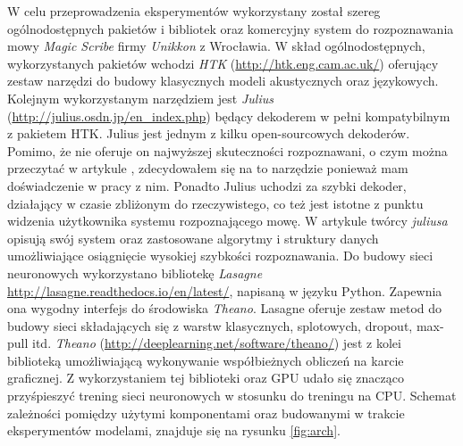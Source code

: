 \documentclass[11pt]{article}
\begin{document}
	W celu przeprowadzenia eksperymentów wykorzystany został szereg ogólnodostępnych pakietów i bibliotek oraz komercyjny system do rozpoznawania mowy \textit{Magic Scribe} firmy \textit{Unikkon} z Wrocławia. W skład ogólnodostępnych, wykorzystanych pakietów wchodzi \textit{HTK} (\url{http://htk.eng.cam.ac.uk/}) oferujący zestaw narzędzi do budowy klasycznych modeli akustycznych oraz językowych. Kolejnym wykorzystanym narzędziem jest \textit{Julius} (\url{http://julius.osdn.jp/en_index.php}) będący dekoderem w pełni kompatybilnym z pakietem HTK. Julius jest jednym z kilku open-sourcowych dekoderów. Pomimo, że nie oferuje on najwyższej skuteczności rozpoznawani, o czym można przeczytać w artykule \cite{asr_toolkit_cmp}, zdecydowałem się na to narzędzie ponieważ mam doświadczenie w pracy z nim. Ponadto Julius uchodzi za szybki dekoder, działający w czasie zbliżonym do rzeczywistego, co też jest istotne z punktu widzenia użytkownika systemu rozpoznającego mowę. W artykule \cite{julius} twórcy \textit{juliusa} opisują swój system oraz zastosowane algorytmy i struktury danych umożliwiające osiągnięcie wysokiej szybkości rozpoznawania. Do budowy sieci neuronowych wykorzystano bibliotekę \textit{Lasagne} \url{http://lasagne.readthedocs.io/en/latest/}, napisaną w języku Python. Zapewnia ona wygodny interfejs do środowiska \textit{Theano}. Lasagne oferuje zestaw metod do budowy sieci składających się z warstw klasycznych, splotowych, dropout, max-pull itd. \textit{Theano} (\url{http://deeplearning.net/software/theano/}) jest z kolei biblioteką umożliwiającą wykonywanie współbieżnych obliczeń na karcie graficznej. Z wykorzystaniem tej biblioteki oraz GPU udało się znacząco przyśpieszyć trening sieci neuronowych w stosunku do treningu na CPU. Schemat zależności pomiędzy użytymi komponentami oraz budowanymi w trakcie eksperymentów modelami, znajduje się na rysunku \ref{fig:arch}. 
	
\end{document}
